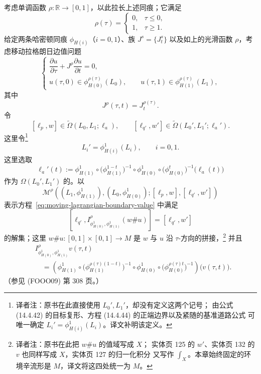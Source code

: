 考虑单调函数 $\rho:\mathbb R\to[0,1]$，以此拉长上述同痕；它满足
\begin{equation}
  \rho(\tau)
  =
  \begin{cases}
    0,&\tau\leq0,\\
    1,&\tau\geq1.
  \end{cases}
\label{eq:continuation-cutoff-function}
\end{equation}
给定两条哈密顿同痕 $\phi_{H(i)}$（$i=0,1$）、族
$J^s=\{J_t^s\}$ 以及如上的光滑函数 $\rho$，考虑移动拉格朗日边值问题
\begin{equation}
  \begin{cases}
    \dfrac{\partial u}{\partial\tau}
    +J^\rho\dfrac{\partial u}{\partial t}=0,\\[6pt]
    u(\tau,0)\in\phi_{H(0)}^{\rho(\tau)}(L_0),
    \qquad
    u(\tau,1)\in\phi_{H(1)}^{\rho(\tau)}(L_1),
  \end{cases}
\label{eq:moving-lagrangian-boundary-value}
\end{equation}
其中
\[
  J^\rho(\tau,t)=J_t^{\rho(\tau)}.
\]
令
\[
  [\ell_p,w]\in\widetilde\Omega(L_0,L_1;\ell_a),
  \qquad
  [\ell_{q'},w']
  \in\widetilde\Omega(L_0',L_1';\ell_a').
\]
这里令\footnote{译者注：原书在此直接使用 $L_0',L_1'$，却没有定义这两个记号；
由公式 (14.4.42) 的目标复形、方程 (14.4.44) 的正端边界以及紧随的基准道路公式
可唯一确定 $L_i'=\phi_{H(i)}^1(L_i)$。译文补明该定义。}
\[
  L_i'=\phi_{H(i)}^1(L_i),
  \qquad i=0,1.
\]
这里选取
\begin{equation}
  \ell_a'(t)
  :=
  \phi_{H(1)}^1
  \circ\bigl(\phi_{H(1)}^{1-t}\bigr)^{-1}
  \circ\phi_{H(0)}^1
  \circ\bigl(\phi_{H(0)}^t\bigr)^{-1}
  \bigl(\ell_a(t)\bigr)
\label{eq:transported-base-path-two-boundaries}
\end{equation}
作为 $\Omega(L_0',L_1')$ 的\termBasePath{}。以
\begin{equation}
  \mathcal M^\rho
  \left(
    (L_1,\phi_{H(1)}^1),(L_0,\phi_{H(0)}^1);
    [\ell_p,w],[\ell_{q'},w']
  \right)
\label{eq:moving-boundary-moduli-space}
\end{equation}
表示方程~\eqref{eq:moving-lagrangian-boundary-value} 中满足
\[
  \left[
    \ell_{q'},
    I_{\phi_{H(0)}^1,\phi_{H(1)}^1}^{\rho}(w\#u)
  \right]
  =
  [\ell_{q'},w']
\]
的解集；这里 $w\#u:[0,1]\times[0,1]\to M$ 是 $w$ 与 $u$ 沿
$\tau$-方向的拼接，\footnote{译者注：原书在此把 $w\#u$ 的值域写成 $X$；
实体页 125 的 $w'$、实体页 132 的 $v$ 也同样写成 $X$，实体页 127 的归一化积分
又写作 $\int_X$。本章始终固定的环境辛流形是 $M$，译文将这四处统一为 $M$。}
并且
\[
  \begin{aligned}
  &I_{\phi_{H(0)}^1,\phi_{H(1)}^1}^{\rho}v(\tau,t)\\
  &\quad=
  \left(
    \phi_{H(1)}^1
    \circ\bigl(\phi_{H(1)}^{\rho(\tau)(1-t)}\bigr)^{-1}
    \circ\phi_{H(0)}^1
    \circ\bigl(\phi_{H(0)}^{\rho(\tau)t}\bigr)^{-1}
  \right)
  \bigl(v(\tau,t)\bigr).
  \end{aligned}
\]
（参见 (FOOO09) 第 308 页。）

